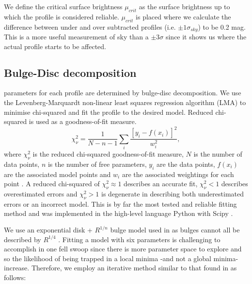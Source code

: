 We define the critical surface brightness $\mu_{crit}$ as the surface brightness up to which the profile is considered reliable. $\mu_{crit}$ is placed where we calculate the difference between under and over subtracted profiles (i.e. $\pm 1 \sigma_{sky}$) to be 0.2 mag. This is a more useful measurement of sky than a $\pm 3 \sigma$ since it shows us where the actual profile starts to be affected.

\subsection{Bulge-Disc decomposition}
\sersic parameters for each profile are determined by bulge-disc decomposition. We use the Levenberg-Marquardt non-linear least squares regression algorithm (LMA) to minimise chi-squared and fit the profile to the desired model. Reduced chi-squared is used as a goodness-of-fit measure.
\begin{equation}
	\chi^{2}_{\nu} = \frac{1}{N-n-1} \sum_{i} \frac{[y_i - f(x_i)]^2}{w_i^2},
\end{equation}
where $\chi_{\nu}^2$ is the reduced chi-squared goodness-of-fit measure, $N$ is the number of data points, $n$ is the number of free parameters, $y_i$ are the data points, $f(x_i)$ are the associated model points and $w_i$ are the associated weightings for each point \citep{marquardt_algorithm_1963}. A reduced chi-squared of $\chi_{\nu}^2 \approx 1$ describes an accurate fit, $\chi_{\nu}^2<1$ describes overestimated errors and $\chi_{\nu}^2>1$ is degenerate in describing both underestimated errors or an incorrect model. This is by far the most tested and reliable fitting method \citep{lawson_solving_1995} and was implemented in the high-level language Python with Scipy \citep{oliphant_python_2007}. 

We use an exponential disk + \sersic $R^{1/n}$ bulge model used in \citet{allen_millennium_2006} as bulges cannot all be described by $R^{1/4}$ \citep{simard_catalog_2011}. Fitting a model with six parameters is challenging to accomplish in one fell swoop since there is more parameter space to explore and so the likelihood of being trapped in a local minima -and not a global minima- increase. Therefore, we employ an iterative method similar to that found in \citet{weinzirl_bulge_2009} as follows:

